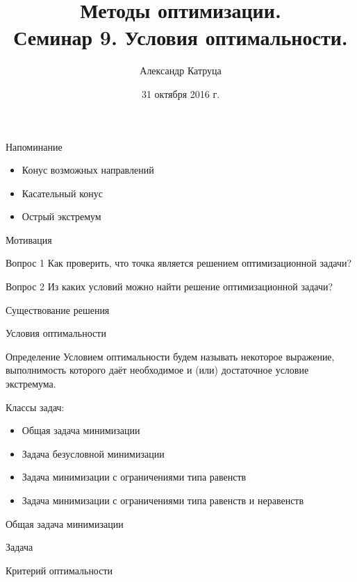 \documentclass[12pt,russian]{beamer}
\title[Семинар 9]{Методы оптимизации. \\
 Семинар 9. Условия оптимальности.}
\author{Александр Катруца}
\institute{Московский физико-технический институт,\\
Факультет Управления и Прикладной Математики}
\date{31 октября 2016 г.}
\begin{document}
\begin{frame}
\maketitle
\end{frame}

\begin{frame}{Напоминание}
\begin{itemize}
\item Конус возможных направлений
\item Касательный конус
\item Острый экстремум
\end{itemize}
\end{frame}

\begin{frame}{Мотивация}

\begin{block}{Вопрос 1}
Как проверить, что точка является решением оптимизационной задачи? 
\end{block}

\begin{block}{Вопрос 2}
Из каких условий можно найти решение оптимизационной задачи?
\end{block}
\end{frame}

\begin{frame}{Существование решения}

\end{frame}

\begin{frame}{Условия оптимальности}
\begin{block}{Определение}
Условием оптимальности будем называть некоторое выражение, выполнимость которого даёт необходимое и (или) достаточное условие экстремума. 
\end{block}
Классы задач:
\begin{itemize}
\item Общая задача минимизации
\item Задача безусловной минимизации
\item Задача минимизации с ограничениями типа равенств
\item Задача минимизации с ограничениями типа равенств и неравенств
\end{itemize}
\end{frame}

\begin{frame}{Общая задача минимизации}

\begin{block}{Задача}

\end{block}

\begin{block}{Критерий оптимальности}

\end{block}

\end{frame}
\end{document}
